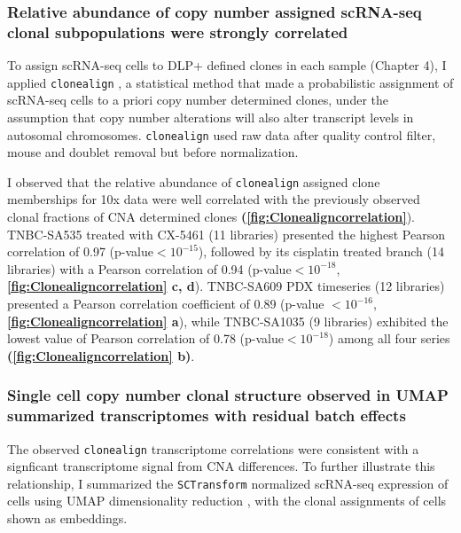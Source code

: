 

\subsubsection{Relative abundance of copy number assigned scRNA-seq clonal subpopulations were strongly correlated}
 
To assign scRNA-seq cells to DLP+ defined clones in each sample (Chapter 4), I applied \texttt{clonealign} \cite{campbell2019clonealign}, a statistical method that made a probabilistic assignment of scRNA-seq cells to a priori copy number determined clones, under the assumption that copy number alterations will also alter transcript levels in autosomal chromosomes. \texttt{clonealign} used raw data after quality control filter, mouse and doublet removal but before normalization.
 
I observed that the relative abundance of \texttt{clonealign} assigned clone memberships for 10x data were well correlated with the previously observed clonal fractions of CNA determined clones \textbf{(\autoref{fig:Clonealigncorrelation}}). TNBC-SA535 treated with CX-5461 (11 libraries) presented the highest Pearson correlation of 0.97 (p-value$< 10^{-15}$), followed by its cisplatin treated branch (14 libraries) with a Pearson correlation of 0.94 (p-value$< 10^{-18}$,  \textbf{\autoref{fig:Clonealigncorrelation} c, d}). TNBC-SA609 PDX timeseries (12 libraries) presented a Pearson correlation coefficient of 0.89 (p-value $< 10^{-16}$, \textbf{\autoref{fig:Clonealigncorrelation} a}), while TNBC-SA1035 (9 libraries) exhibited the lowest value of Pearson correlation of 0.78 (p-value$< 10^{-18}$) among all four series \textbf{(\autoref{fig:Clonealigncorrelation} b)}.
  
  
\subsubsection{Single cell copy number clonal structure observed in UMAP summarized transcriptomes with residual batch effects}

The observed \texttt{clonealign} transcriptome correlations were consistent with a signficant transcriptome signal from CNA differences.  To further illustrate this relationship, I summarized the \texttt{SCTransform} normalized scRNA-seq expression of cells using UMAP dimensionality reduction \cite{becht2019dimensionality}, with the clonal assignments of cells shown as embeddings. 

